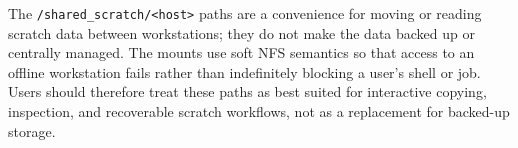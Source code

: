 \documentclass[11pt,a4paper]{article}
\begin{document}
The \texttt{/shared\_scratch/<host>} paths are a convenience for moving or reading
scratch data between workstations; they do not make the data backed up or
centrally managed.  The mounts use soft NFS semantics so that access to an
offline workstation fails rather than indefinitely blocking a user's shell or
job.  Users should therefore treat these paths as best suited for interactive
copying, inspection, and recoverable scratch workflows, not as a replacement for
backed-up storage.
\end{document}
